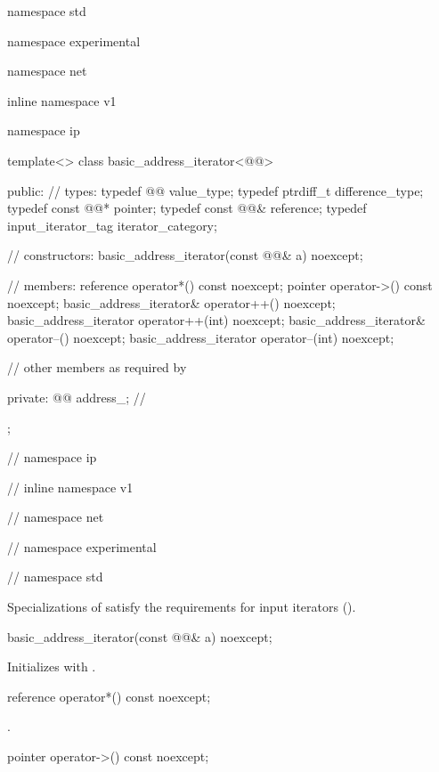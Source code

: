 \begin{codeblock}
namespace std {
namespace experimental {
namespace net {
inline namespace v1 {
namespace ip {

  template<> class basic_address_iterator<@@>
  {
  public:
    // types:
    typedef @@ value_type;
    typedef ptrdiff_t difference_type;
    typedef const @@* pointer;
    typedef const @@& reference;
    typedef input_iterator_tag iterator_category;

    // constructors:
    basic_address_iterator(const @@& a) noexcept;

    // members:
    reference operator*() const noexcept;
    pointer operator->() const noexcept;
    basic_address_iterator& operator++() noexcept;
    basic_address_iterator operator++(int) noexcept;
    basic_address_iterator& operator--() noexcept;
    basic_address_iterator operator--(int) noexcept;

    // other members as required by 

  private:
    @@ address_; // \expos
  };

} // namespace ip
} // inline namespace v1
} // namespace net
} // namespace experimental
} // namespace std
\end{codeblock}

\pnum
Specializations of  satisfy the requirements for input iterators ().

\begin{itemdecl}
basic_address_iterator(const @@& a) noexcept;
\end{itemdecl}

\begin{itemdescr}
\pnum
\effects Initializes  with .
\end{itemdescr}

\begin{itemdecl}
reference operator*() const noexcept;
\end{itemdecl}

\begin{itemdescr}
\pnum
\returns {}.
\end{itemdescr}

\begin{itemdecl}
pointer operator->() const noexcept;
\end{itemdecl}

